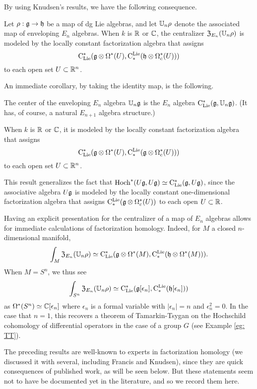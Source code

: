 \documentclass[11pt]{amsart}
\numberwithin{equation}{section}
\begin{document}
By using Knudsen's results, we have the following consequence.

\begin{cor}
Let $\rho: \mathfrak g \to \mathfrak h$ be a map of dg Lie algebras, and let $\mathbb U_n \rho$ denote the associated map of enveloping $E_n$ algebras.
When $k$ is $\mathbb R$ or $\mathbb C$, 
the centralizer ${\frak Z}_{E_n}(\mathbb U_n \rho)$ is modeled by the locally constant factorization algebra that assigns
\[
{\rm C}_{\rm Lie}^*(\mathfrak g \otimes \Omega^*(U), {\rm C}^{\rm Lie}_*( \mathfrak h \otimes \Omega^*_c(U)))
\]
to each open set $U \subset \mathbb R^n$.
\end{cor}

An immediate corollary, by taking the identity map, is the following.

\begin{cor}
\label{thm: center}
The center of the enveloping $E_n$ algebra $\mathbb U_n\mathfrak g$ is the $E_n$ algebra ${\rm C}_{\rm Lie}^*(\mathfrak g, \mathbb U_n\mathfrak g)$.
(It has, of course, a natural $E_{n+1}$ algebra structure.) 

When $k$ is $\mathbb R$ or $\mathbb C$, 
it is modeled by the locally constant factorization algebra that assigns
\[
{\rm C}_{\rm Lie}^*(\mathfrak g \otimes \Omega^*(U), {\rm C}^{\rm Lie}_*( \mathfrak g \otimes \Omega^*_c(U)))
\]
to each open set $U \subset \mathbb R^n$.
\end{cor}

This result generalizes the fact that ${\rm Hoch}^*(U\mathfrak g,U\mathfrak g) \simeq {\rm C}_{\rm Lie}^*(\mathfrak g, U\mathfrak g)$, since the associative algebra $U\mathfrak g$ is modeled by the locally constant one-dimensional factorization algebra that assigns ${\rm C}^{\rm Lie}_* (\mathfrak g \otimes \Omega^*_c(U))$ to each open $U \subset \mathbb R$. 

Having an explicit presentation for the centralizer of a map of $E_n$ algebras allows for immediate calculations of factorization homology.
Indeed, for $M$ a closed $n$-dimensional manifold,
\[
\int_M {\frak Z}_{E_n}(\mathbb U_n \rho) \simeq {\rm C}_{\rm Lie}^*(\mathfrak g \otimes \Omega^*(M), {\rm C}^{\rm Lie}_*( \mathfrak h \otimes \Omega^*(M))).
\]
When $M = S^n$, we thus see
\[
\int_{S^n} {\frak Z}_{E_n}(\mathbb U_n \rho) \simeq {\rm C}_{\rm Lie}^*(\mathfrak g[\epsilon_n], {\rm C}^{\rm Lie}_*( \mathfrak h[\epsilon_n]))
\]
as $\Omega^*(S^n) \simeq \mathbb C[\epsilon_n]$ where $\epsilon_n$ is a formal variable with $|\epsilon_n| = n$ and $\epsilon_n^2 = 0$.
In the case that $n=1$, this recovers a theorem of Tamarkin-Tsygan \cite{TT} on the Hochschild cohomology of differential operators in the case of a group $G$ (see Example \ref{eg: TT}). 

\begin{rmk}
The preceding results are well-known to experts in factorization homology (we discussed it with several, including Francis and Knudsen),
since they are quick consequences of published work, as will be seen below.
But these statements seem not to have be documented yet in the literature, 
and so we record them here.
\end{rmk}
\end{document}
